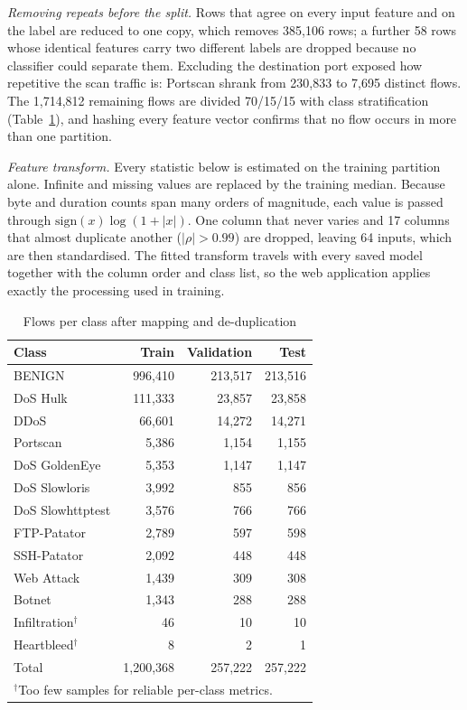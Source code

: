 \documentclass[conference]{IEEEtran}
\begin{document}
\textit{Removing repeats before the split.} Rows that agree on every input feature and on the
label are reduced to one copy, which removes 385,106 rows; a further 58 rows whose identical
features carry two different labels are dropped because no classifier could separate them.
Excluding the destination port exposed how repetitive the scan traffic is: Portscan shrank from
230,833 to 7,695 distinct flows. The 1,714,812 remaining flows are divided 70/15/15 with class
stratification (Table~\ref{tab:classes}), and hashing every feature vector confirms that no flow
occurs in more than one partition.

\textit{Feature transform.} Every statistic below is estimated on the training partition alone.
Infinite and missing values are replaced by the training median. Because byte and duration
counts span many orders of magnitude, each value is passed through $\mathrm{sign}(x)\log(1+|x|)$.
One column that never varies and 17 columns that almost duplicate another ($|\rho|>0.99$) are
dropped, leaving 64 inputs, which are then standardised. The fitted transform travels with every
saved model together with the column order and class list, so the web application applies
exactly the processing used in training.

\begin{table}[t]
\caption{Flows per class after mapping and de-duplication}
\label{tab:classes}
\centering
\footnotesize
\begin{tabular}{lrrr}
\toprule
Class & Train & Validation & Test \\
\midrule
BENIGN & 996,410 & 213,517 & 213,516 \\
DoS Hulk & 111,333 & 23,857 & 23,858 \\
DDoS & 66,601 & 14,272 & 14,271 \\
Portscan & 5,386 & 1,154 & 1,155 \\
DoS GoldenEye & 5,353 & 1,147 & 1,147 \\
DoS Slowloris & 3,992 & 855 & 856 \\
DoS Slowhttptest & 3,576 & 766 & 766 \\
FTP-Patator & 2,789 & 597 & 598 \\
SSH-Patator & 2,092 & 448 & 448 \\
Web Attack & 1,439 & 309 & 308 \\
Botnet & 1,343 & 288 & 288 \\
Infiltration$^\dagger$ & 46 & 10 & 10 \\
Heartbleed$^\dagger$ & 8 & 2 & 1 \\
\midrule
Total & 1,200,368 & 257,222 & 257,222 \\
\bottomrule
\multicolumn{4}{l}{$^\dagger$Too few samples for reliable per-class metrics.}
\end{tabular}
\end{table}
\end{document}
